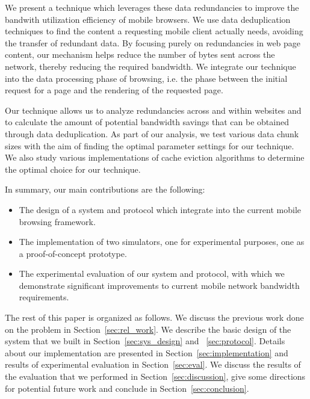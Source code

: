 We present a technique which leverages these data redundancies to improve the bandwith utilization efficiency of mobile browsers. We use data deduplication 
techniques to find the content a requesting mobile client actually needs, avoiding the transfer of redundant data. By focusing purely on redundancies in web 
page content, our mechanism helps reduce the number of bytes sent across the network, thereby reducing the required bandwidth. We integrate our technique into 
the data processing phase of browsing, i.e. the phase between the initial request for a page and the rendering of the requested page. 


Our technique allows us to analyze redundancies across and within websites and to calculate the amount of potential bandwidth savings that can be obtained through data deduplication. As part of our analysis, we test various data chunk sizes with the aim of finding the optimal parameter settings for our technique. We also study various implementations of cache eviction algorithms to determine the optimal choice for our technique. 


In summary, our main contributions are the following:
\begin{itemize}
\item The design of a system and protocol which integrate into the current mobile browsing framework.
\item The implementation of two simulators, one for experimental purposes, one as a proof-of-concept prototype.
\item The experimental evaluation of our system and protocol, with which we demonstrate significant improvements to current mobile network bandwidth requirements.
\end{itemize}

The rest of this paper is organized as follows. We discuss the previous work done on the problem in Section~\ref{sec:rel_work}. We describe the basic design of the 
system that we built in Section~\ref{sec:sys_design} and ~\ref{sec:protocol}. Details about our implementation are presented in Section~\ref{sec:implementation} 
and results of experimental evaluation in Section~\ref{sec:eval}. We discuss the results of the evaluation that we performed in Section~\ref{sec:discussion}, give 
some directions for potential future work and conclude in Section~\ref{sec:conclusion}.
